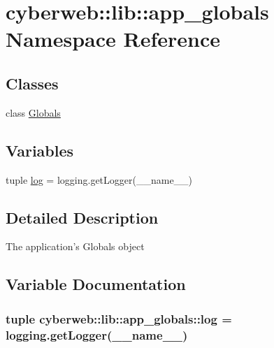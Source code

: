 \hypertarget{namespacecyberweb_1_1lib_1_1app__globals}{\section{cyberweb\-:\-:lib\-:\-:app\-\_\-globals \-Namespace \-Reference}
\label{namespacecyberweb_1_1lib_1_1app__globals}
}
\subsection*{\-Classes}
\begin{DoxyCompactItemize}
\item 
class \hyperlink{classcyberweb_1_1lib_1_1app__globals_1_1_globals}{\-Globals}
\end{DoxyCompactItemize}
\subsection*{\-Variables}
\begin{DoxyCompactItemize}
\item 
tuple \hyperlink{namespacecyberweb_1_1lib_1_1app__globals_aa78e8b180ad09b6d31d04acfab80c3db}{log} = logging.\-get\-Logger(\-\_\-\-\_\-name\-\_\-\-\_\-)
\end{DoxyCompactItemize}


\subsection{\-Detailed \-Description}
\begin{DoxyVerb}The application's Globals object\end{DoxyVerb}
 

\subsection{\-Variable \-Documentation}
\hypertarget{namespacecyberweb_1_1lib_1_1app__globals_aa78e8b180ad09b6d31d04acfab80c3db}{
\subsubsection[{log}]{\setlength{\rightskip}{0pt plus 5cm}tuple {\bf cyberweb\-::lib\-::app\-\_\-globals\-::log} = logging.\-get\-Logger(\-\_\-\-\_\-name\-\_\-\-\_\-)}}\label{namespacecyberweb_1_1lib_1_1app__globals_aa78e8b180ad09b6d31d04acfab80c3db}
